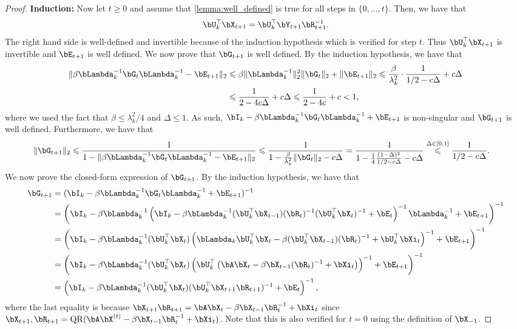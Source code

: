 \documentclass{article}
\theoremstyle{plain}
\theoremstyle{definition}
\theoremstyle{remark}
\begin{document}
\begin{proof}
  \textbf{Induction:} Now let $t\geqslant 0$ and assume that \cref{lemma:well_defined} is true for all steps in $\{0,\dots,t\}$. Then, we have that
  \begin{align*}
    \bU_k^\top\bX_{t+1} = \bU_k^\top\bY_{t+1}\bR_{t+1}^{-1}.
  \end{align*}
  The right hand side is well-defined and invertible because of the induction hypothesis which is verified for step $t$. Thus $\bU_k^\top\bX_{t+1}$ is invertible and $\bE_{t+1}$ is well defined. We now prove that $\bG_{t+1}$ is well defined. By the induction hypothesis, we have that
  \begin{align*}
    \Vert \beta\bLambda^{-1}_k \bG_t \bLambda_k^{-1} - \bE_{t+1} \Vert_2 & \leqslant \beta \Vert \bLambda_k^{-1} \Vert_2^2 \Vert \bG_t \Vert_2 + \Vert \bE_{t+1} \Vert_2 \leqslant \frac{\beta}{\lambda_k^2} \cdot \frac{1}{1/2 - c\Delta} + c\Delta \\
    & \leqslant \frac{1}{2 - 4c\Delta} + c\Delta \leqslant \frac{1}{2 - 4c} + c < 1,
  \end{align*}
  where we used the fact that $\beta \leqslant \lambda_k^2/4$ and $\Delta \leqslant 1$. As such, $\bI_k - \beta\bLambda^{-1}_k \bG_t \bLambda_k^{-1} + \bE_{t+1}$ is non-singular and $\bG_{t+1}$ is well defined. Furthermore, we have that
  \begin{align*}
    \Vert \bG_{t+1} \Vert_2 & \leqslant \frac{1}{1 - \Vert \beta\bLambda^{-1}_k \bG_t \bLambda_k^{-1} - \bE_{t+1} \Vert_2} \leqslant \frac{1}{1 - \frac{\beta}{\lambda_k^2}\Vert\bG_t\Vert_2 - c\Delta} = \frac{1}{1 - \frac{1}{4}\frac{(1-\Delta)^2}{1/2 - c\Delta} - c\Delta} \stackrel{\Delta\in[0,1]}{\leqslant} \frac{1}{1/2 - c\Delta}.
  \end{align*}
  We now prove the closed-form expression of $\bG_{t+1}$. By the induction hypothesis, we have that
  \begin{align*}
      \bG_{t+1} & = (\bI_k - \beta\bLambda_k^{-1}\bG_t\bLambda_k^{-1} + \bE_{t+1})^{-1} \\
      & = \left(\bI_k - \beta\bLambda_k^{-1}\left( \bI_k - \beta\bLambda_k^{-1}(\bU_k^\top\bX_{t-1})(\bR_t)^{-1} (\bU_k^\top\bX_t)^{-1} + \bE_t \right)^{-1}\bLambda_k^{-1} + \bE_{t+1}\right)^{-1} \\
      & = \left(\bI_k - \beta\bLambda_k^{-1}(\bU_k^\top\bX_t)\left( \bLambda_k\bU_k^\top\bX_t - \beta(\bU_k^\top\bX_{t-1})(\bR_t)^{-1} + \bU_k^\top\bXi_t \right)^{-1} + \bE_{t+1}\right)^{-1} \\
      & = \left(\bI_k - \beta\bLambda_k^{-1}(\bU_k^\top\bX_t)\left(\bU_k^\top\left( \bA\bX_t - \beta\bX_{t-1}(\bR_t)^{-1} + \bXi_t \right)\right)^{-1} + \bE_{t+1}\right)^{-1} \\
      & = \left( \bI_k - \beta\bLambda_k^{-1}(\bU_k^\top\bX_t)(\bU_k^\top\bX_{t+1}\bR_{t+1})^{-1} + \bE_t \right)^{-1},   
  \end{align*}
  where the last equality is because $\bX_{t+1} \bR_{t+1} = \bA\bX_{t} - \beta \bX_{t-1}\bR_t^{-1} + \bXi_{t}$ since $\bX_{t+1}, \bR_{t+1} = \mathrm{QR}(\bA\bX^{(t)} - \beta \bX_{t-1}\bR_t^{-1} + \bXi_t)$. Note that this is also verified for $t=0$ using the definition of $\bX_{-1}$. 
  

\end{proof}
\end{document}
